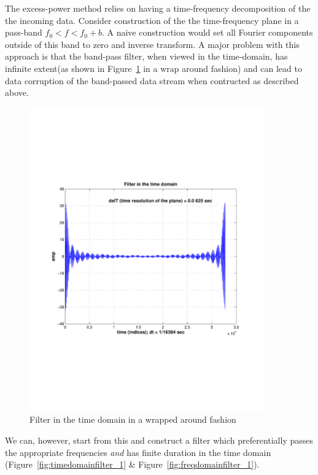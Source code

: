 The excess-power method relies on having a time-frequency
decomposition of the the incoming data.   Consider construction of the
the time-frequency plane in a pass-band $f_0 < f < f_0+b$.  A naive
construction would set all Fourier components outside of this band to
zero and inverse transform.  A major problem with this approach is
that the band-pass filter,  when viewed in the time-domain, has
infinite extent(as shown in Figure~\ref{fig:timedomainfilter} in a wrap around
fashion) and can 
lead to data corruption of the band-passed
data stream when contructed as described above. 

\begin{figure}
\begin{center}
\includegraphics[width=0.9\textwidth]{figures/timedomainfilter}
\caption{Filter in the time domain in a wrapped around fashion}
\label{fig:timedomainfilter}
\end{center}
\end{figure}
 
   We can,  however, start from this and construct a filter which preferentially
passes the appropriate frequencies \emph{and} has finite duration in
the time domain (Figure~\ref{fig:timedomainfilter_1} \& Figure~\ref{fig:freqdomainfilter_1}).

